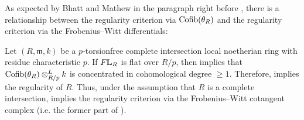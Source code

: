\documentclass[11pt,a4paper]{amsart}
\begin{document}
As expected by Bhatt and Mathew in the paragraph right before \cite[Lemma 4.18]{bhatt2023Syntomic}, there is a relationship between the regularity criterion via $\operatorname{Cofib}(\theta_R)$ and the regularity criterion via the Frobenius--Witt differentials:
\begin{remark}
Let $(R,\mathfrak m,k)$ be a $p$-torsionfree complete intersection local noetherian ring with residue characteristic $p$.
If $F\mathbb{L}_R$ is flat over $R/p$, then  implies that $\operatorname{Cofib}(\theta_R)\otimes_{R/p}^Lk$ is concentrated in cohomological degree $\ge 1$. Therefore, \cite[Proposition 4.19]{bhatt2023Syntomic} implies the regularity of $R$. Thus, under the assumption that $R$ is a complete intersection, \cite[Proposition 4.19]{bhatt2023Syntomic} implies the regularity criterion via the Frobenius--Witt cotangent complex (i.e. the former part of \cite[Theorem 5.2]{mao2026FrobeniusWitt}).
\end{remark}
\end{document}
